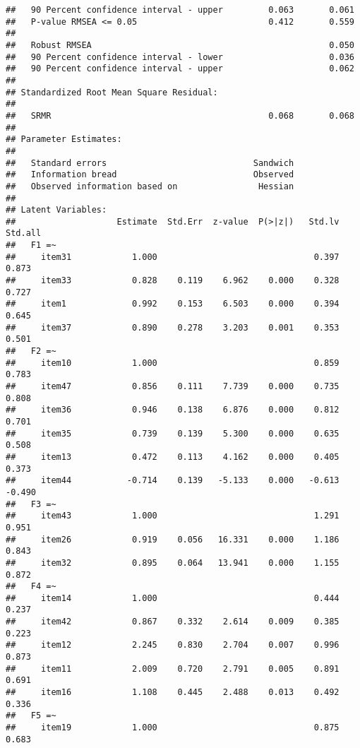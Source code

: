 \documentclass[
  english,
  man]{apa6}
\begin{document}
\begin{verbatim}
##   90 Percent confidence interval - upper         0.063       0.061
##   P-value RMSEA <= 0.05                          0.412       0.559
##                                                                   
##   Robust RMSEA                                               0.050
##   90 Percent confidence interval - lower                     0.036
##   90 Percent confidence interval - upper                     0.062
## 
## Standardized Root Mean Square Residual:
## 
##   SRMR                                           0.068       0.068
## 
## Parameter Estimates:
## 
##   Standard errors                             Sandwich
##   Information bread                           Observed
##   Observed information based on                Hessian
## 
## Latent Variables:
##                    Estimate  Std.Err  z-value  P(>|z|)   Std.lv  Std.all
##   F1 =~                                                                 
##     item31            1.000                               0.397    0.873
##     item33            0.828    0.119    6.962    0.000    0.328    0.727
##     item1             0.992    0.153    6.503    0.000    0.394    0.645
##     item37            0.890    0.278    3.203    0.001    0.353    0.501
##   F2 =~                                                                 
##     item10            1.000                               0.859    0.783
##     item47            0.856    0.111    7.739    0.000    0.735    0.808
##     item36            0.946    0.138    6.876    0.000    0.812    0.701
##     item35            0.739    0.139    5.300    0.000    0.635    0.508
##     item13            0.472    0.113    4.162    0.000    0.405    0.373
##     item44           -0.714    0.139   -5.133    0.000   -0.613   -0.490
##   F3 =~                                                                 
##     item43            1.000                               1.291    0.951
##     item26            0.919    0.056   16.331    0.000    1.186    0.843
##     item32            0.895    0.064   13.941    0.000    1.155    0.872
##   F4 =~                                                                 
##     item14            1.000                               0.444    0.237
##     item42            0.867    0.332    2.614    0.009    0.385    0.223
##     item12            2.245    0.830    2.704    0.007    0.996    0.873
##     item11            2.009    0.720    2.791    0.005    0.891    0.691
##     item16            1.108    0.445    2.488    0.013    0.492    0.336
##   F5 =~                                                                 
##     item19            1.000                               0.875    0.683

\end{verbatim}
\end{document}
